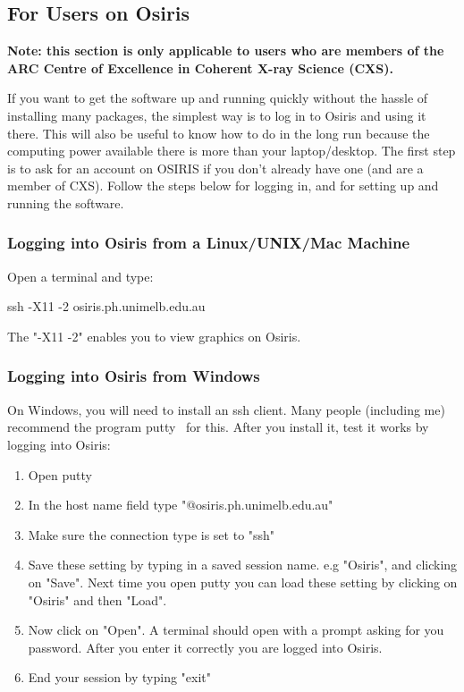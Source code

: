 \documentclass[]{nadia}
\begin{document}
\subsection{For Users on Osiris}

\bf{Note: this section is only applicable to users who are members of
the ARC Centre of Excellence in Coherent X-ray Science (CXS).}

If you want to get the software up and running quickly without the hassle of
installing many packages, the simplest way is to log in to Osiris
and using it there. This will also be useful to know how to do in the
long run because the computing power available there is more than your
laptop/desktop. The first step is to ask for an account on OSIRIS if
you don't already have one (and are a member of CXS). Follow the
steps below for logging in, and for setting up and running the
software.

\subsubsection{Logging into Osiris from a Linux/UNIX/Mac Machine}

Open a terminal and type: 
\begin{myverbatim}
  ssh -X11 -2 osiris.ph.unimelb.edu.au 
\end{myverbatim}
The "-X11 -2" enables you to view graphics on Osiris.

\subsubsection{Logging into Osiris from Windows}

On Windows, you will need to install an ssh client. Many people
(including me) recommend the program putty~\cite{putty} for this.  After
you install it, test it works by logging into Osiris:
\begin{enumerate}
\item Open putty 
\item In the host name field type "@osiris.ph.unimelb.edu.au" 
\item Make sure the connection type is set to "ssh" 
\item Save these setting by typing in a saved session name. e.g
  "Osiris", and clicking on "Save". Next time you open putty you can load
  these setting by clicking on "Osiris" and then "Load".
\item Now click on "Open". A terminal should open with a prompt asking
  for you password. After you enter it correctly you are logged into
  Osiris.
\item End your session by typing "exit"
\end{enumerate}
\end{document}
